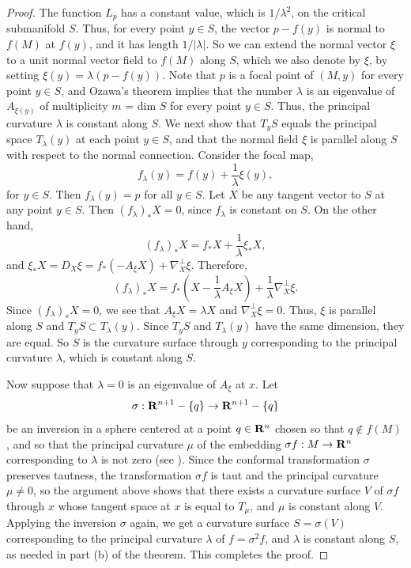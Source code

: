 \documentclass[12pt]{article}
\begin{document}
{\begin{proof}
The function $L_p$ has a constant value, which is $1/{\lambda}^2$,
on the critical submanifold $S$.  Thus, for every point $y \in S$, 
the vector $p-f(y)$ is normal to $f(M)$ at $f(y)$, and it has
length $1/|\lambda|$.  So we can extend the normal vector $\xi$ to
a unit normal vector field to $f(M)$ along $S$,
which we also denote by $\xi$, by setting $\xi(y) = \lambda (p-f(y))$.
Note that $p$ is a focal point of $(M,y)$ for every point
$y \in S$, and Ozawa's theorem implies that the number $\lambda$
is an eigenvalue of $A_{\xi(y)}$ of multiplicity
$m$ = dim $S$ for every point $y \in S$.  Thus, the principal
curvature $\lambda$ is constant along $S$.  We next show that $T_yS$ equals the 
principal space $T_{\lambda}(y)$ at each point $y \in S$, and that 
the normal field $\xi$ is parallel along $S$ with respect to the
normal connection.  Consider the focal map,
\begin{displaymath}
f_{\lambda}(y) = f(y) + \frac{1}{\lambda} \xi(y),
\end{displaymath}
for $y \in S$.  Then $f_{\lambda}(y) = p$ for all $y \in S$.
Let $X$ be any tangent vector to $S$ at any point $y \in S$.
Then $(f_{\lambda})_*X = 0$, since $f_{\lambda}$ is constant on $S$.
On the other hand,
\begin{displaymath}
(f_{\lambda})_*X = f_*X + \frac{1}{\lambda} \xi_*X,
\end{displaymath}
and $\xi_*X = D_X\xi = f_*(-A_{\xi}X) + \nabla_X^{\perp}\xi$.  
Therefore,
\begin{displaymath}
(f_{\lambda})_*X = f_*(X -\frac{1}{\lambda} A_{\xi}X) + 
\frac{1}{\lambda} \nabla_X^{\perp}\xi.
\end{displaymath}
Since $(f_{\lambda})_*X = 0$, we see that $A_{\xi}X = \lambda X$ and
$\nabla_X^{\perp}\xi = 0$.  Thus, $\xi$ is parallel along $S$
and $T_yS \subset T_{\lambda}(y)$.  Since $T_yS$ and $T_{\lambda}(y)$
have the same dimension, they are equal.  So $S$ is the
curvature surface through $y$ corresponding to the principal curvature $\lambda$, which is constant along $S$.

Now suppose that $\lambda =0$ is an eigenvalue of $A_{\xi}$ at $x$.  Let 
\begin{displaymath}
\sigma:{\bf R}^{n+1} - \{ q \} \rightarrow {\bf R}^{n+1} - \{ q \}
\end{displaymath}
be an inversion in a sphere
centered at a point $q \in {\bf R}^n$ chosen so that $q \notin f(M)$, and so that the principal curvature $\mu$
of the embedding $\sigma f:M \rightarrow {\bf R}^n$ corresponding to $\lambda$ is not zero
(see \cite[pp. 20--22]{CR8}).  
Since the conformal transformation $\sigma$ preserves tautness, the transformation
$\sigma f$ is taut and the principal curvature $\mu \neq 0$, so the argument above shows that there
exists a curvature surface $V$ of $\sigma f$ through $x$ whose tangent space at $x$ is equal to $T_{\mu}$, and $\mu$ is constant along $V$.
Applying the inversion $\sigma$ again, we get a curvature surface $S = \sigma (V)$ corresponding to the principal curvature $\lambda$ of $f = \sigma^2 f$, 
and $\lambda$ is constant along $S$, as needed in part (b) of the theorem. This completes the proof.
\end{proof}

}
\end{document}
